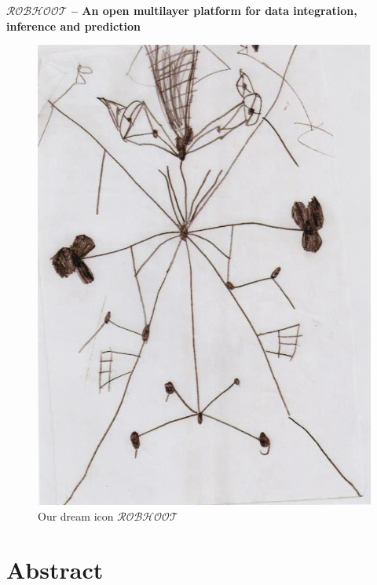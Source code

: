 \documentclass[english,12pt]{article}
\date{}
\begin{document}
\begin{flushleft}
\textbf{\Large {$\mathcal{ROBHOOT}$} -- An open multilayer platform for data integration, inference and prediction}
\\
\begin{figure}
\vspace{-7 in}
\begin{center}
\includegraphics[scale=0.4]{robhootcartoon.pdf}
\end{center}
\caption{Our dream icon $\mathcal{ROBHOOT}$}
\end{figure}
\end{flushleft}

\newpage


\tableofcontents
\newpage

\section{Abstract}
\end{document}
